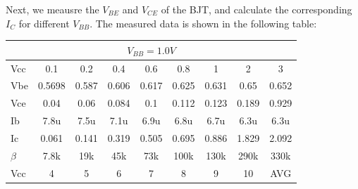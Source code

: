     Next, we meausre the $V_{BE}$ and $V_{CE}$ of the BJT, and calculate the corresponding $I_C$ for different $V_{BB}$. The measured data is shown in the following table:
    \begin{table}[H]
    \centering
        \begin{tabular}{ccccccccc}
            \midrule
        \multicolumn{9}{c}{$V_{BB}=1.0V$}                                                                                                                                                                                                                     \\
        \midrule
        \multicolumn{1}{l|}{Vcc}     & \multicolumn{1}{c}{0.1}    & \multicolumn{1}{c}{0.2}    & \multicolumn{1}{c}{0.4}    & \multicolumn{1}{c}{0.6}    & \multicolumn{1}{c}{0.8}    & \multicolumn{1}{c}{1}      & \multicolumn{1}{c}{2}     & 3      \\
        \multicolumn{1}{l|}{Vbe}     & \multicolumn{1}{c}{0.5698} & \multicolumn{1}{c}{0.587}  & \multicolumn{1}{c}{0.606}  & \multicolumn{1}{c}{0.617}  & \multicolumn{1}{c}{0.625}  & \multicolumn{1}{c}{0.631}  & \multicolumn{1}{c}{0.65}  & 0.652  \\
        \multicolumn{1}{l|}{Vce}     & \multicolumn{1}{c}{0.04}   & \multicolumn{1}{c}{0.06}   & \multicolumn{1}{c}{0.084}  & \multicolumn{1}{c}{0.1}    & \multicolumn{1}{c}{0.112}  & \multicolumn{1}{c}{0.123}  & \multicolumn{1}{c}{0.189} & 0.929  \\
        \multicolumn{1}{l|}{Ib}      & \multicolumn{1}{c}{7.8u}   & \multicolumn{1}{c}{7.5u}   & \multicolumn{1}{c}{7.1u}   & \multicolumn{1}{c}{6.9u}   & \multicolumn{1}{c}{6.8u}   & \multicolumn{1}{c}{6.7u}   & \multicolumn{1}{c}{6.3u}  & 6.3u   \\
        \multicolumn{1}{l|}{Ic}      & \multicolumn{1}{c}{0.061}  & \multicolumn{1}{c}{0.141}  & \multicolumn{1}{c}{0.319}  & \multicolumn{1}{c}{0.505}  & \multicolumn{1}{c}{0.695}  & \multicolumn{1}{c}{0.886}  & \multicolumn{1}{c}{1.829} & 2.092  \\
        \multicolumn{1}{l|}{$\beta$} & \multicolumn{1}{c}{7.8k}   & \multicolumn{1}{c}{19k}    & \multicolumn{1}{c}{45k}    & \multicolumn{1}{c}{73k}    & \multicolumn{1}{c}{100k}   & \multicolumn{1}{c}{130k}   & \multicolumn{1}{c}{290k}  & 330k   \\
        \midrule
        \midrule
        \multicolumn{1}{l|}{Vcc}     & \multicolumn{1}{c}{4}      & \multicolumn{1}{c}{5}      & \multicolumn{1}{c}{6}      & \multicolumn{1}{c}{7}      & \multicolumn{1}{c}{8}      & \multicolumn{1}{c}{9}      & \multicolumn{1}{c}{10}    & AVG    \\

\end{tabular}
\end{table}
